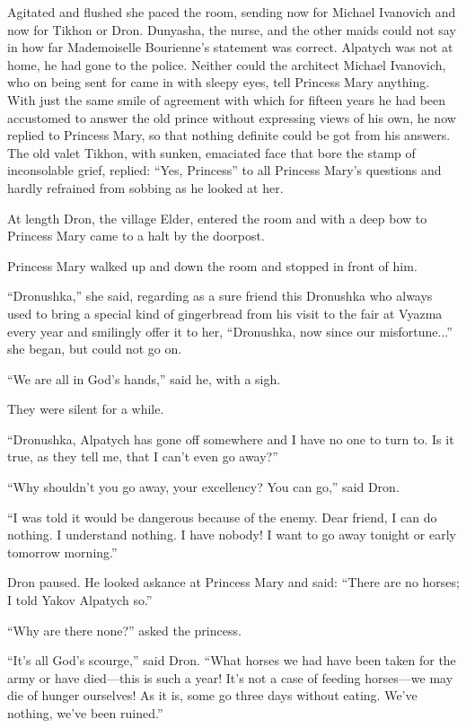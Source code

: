 Agitated and flushed she paced the room, sending now for Michael
Ivanovich and now for Tikhon or Dron. Dunyasha, the nurse, and
the other maids could not say in how far Mademoiselle Bourienne's
statement was correct. Alpatych was not at home, he had gone to
the police. Neither could the architect Michael Ivanovich, who on
being sent for came in with sleepy eyes, tell Princess Mary
anything. With just the same smile of agreement with which for
fifteen years he had been accustomed to answer the old prince
without expressing views of his own, he now replied to Princess
Mary, so that nothing definite could be got from his answers. The
old valet Tikhon, with sunken, emaciated face that bore the stamp
of inconsolable grief, replied: ``Yes, Princess'' to all Princess
Mary's questions and hardly refrained from sobbing as he looked
at her.

At length Dron, the village Elder, entered the room and with a
deep bow to Princess Mary came to a halt by the doorpost.

Princess Mary walked up and down the room and stopped in front of
him.

``Dronushka,'' she said, regarding as a sure friend this
Dronushka who always used to bring a special kind of gingerbread
from his visit to the fair at Vyazma every year and smilingly
offer it to her, ``Dronushka, now since our misfortune...'' she
began, but could not go on.

``We are all in God's hands,'' said he, with a sigh.

They were silent for a while.

``Dronushka, Alpatych has gone off somewhere and I have no one to
turn to. Is it true, as they tell me, that I can't even go
away?''

``Why shouldn't you go away, your excellency? You can go,'' said
Dron.

``I was told it would be dangerous because of the enemy. Dear
friend, I can do nothing. I understand nothing. I have nobody! I
want to go away tonight or early tomorrow morning.''

Dron paused. He looked askance at Princess Mary and said: ``There
are no horses; I told Yakov Alpatych so.''

``Why are there none?'' asked the princess.

``It's all God's scourge,'' said Dron. ``What horses we had have
been taken for the army or have died---this is such a year! It's
not a case of feeding horses---we may die of hunger ourselves! As
it is, some go three days without eating. We've nothing, we've
been ruined.''

